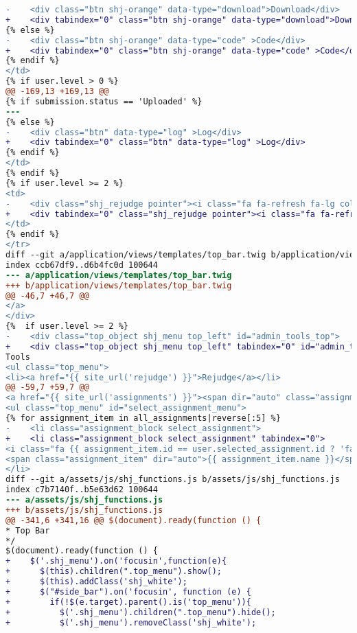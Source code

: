 \begin{itemize}
\begin{lstlisting}[language=diff, caption=Perubahan untuk mematuhi kriteria 2.1.1, label=lst_2.1.1, basicstyle=\ttfamily, frame=single,
columns=fullflexible, keepspaces=true, breaklines=true]
-    <div class="btn shj-orange" data-type="download">Download</div>
+    <div tabindex="0" class="btn shj-orange" data-type="download">Download</div>
{% else %}
-    <div class="btn shj-orange" data-type="code" >Code</div>
+    <div tabindex="0" class="btn shj-orange" data-type="code" >Code</div>
{% endif %}
</td>
{% if user.level > 0 %}
@@ -169,13 +169,13 @@
{% if submission.status == 'Uploaded' %}
---
{% else %}
-    <div class="btn" data-type="log" >Log</div>
+    <div tabindex="0" class="btn" data-type="log" >Log</div>
{% endif %}
</td>
{% endif %}
{% if user.level >= 2 %}
<td>
-    <div class="shj_rejudge pointer"><i class="fa fa-refresh fa-lg color10"></i></div>
+    <div tabindex="0" class="shj_rejudge pointer"><i class="fa fa-refresh fa-lg color10"></i></div>
</td>
{% endif %}
</tr>
diff --git a/application/views/templates/top_bar.twig b/application/views/templates/top_bar.twig
index ccb67df9..d6b4fc0d 100644
--- a/application/views/templates/top_bar.twig
+++ b/application/views/templates/top_bar.twig
@@ -46,7 +46,7 @@
</a>
</div>
{%  if user.level >= 2 %}
-    <div class="top_object shj_menu top_left" id="admin_tools_top">
+    <div class="top_object shj_menu top_left" tabindex="0" id="admin_tools_top">
Tools
<ul class="top_menu">
<li><a href="{{ site_url('rejudge') }}">Rejudge</a></li>
@@ -59,7 +59,7 @@
<a href="{{ site_url('assignments') }}"><span dir="auto" class="assignment_name">{{ user.selected_assignment.name|length > 30 ? user.selected_assignment.name|slice(0, 30) ~ '...' : user.selected_assignment.name }}</span></a>
<ul class="top_menu" id="select_assignment_menu">
{% for assignment_item in all_assignments|reverse[:5] %}
-    <li class="assignment_block select_assignment">
+    <li class="assignment_block select_assignment" tabindex="0">
<i class="fa {{ assignment_item.id == user.selected_assignment.id ? 'fa-check-square-o color6' : 'fa-square-o' }}" data-id="{{ assignment_item.id }}"></i>
<span class="assignment_item" dir="auto">{{ assignment_item.name }}</span>
</li>
diff --git a/assets/js/shj_functions.js b/assets/js/shj_functions.js
index c7b7140f..b5e63d62 100644
--- a/assets/js/shj_functions.js
+++ b/assets/js/shj_functions.js
@@ -341,6 +341,16 @@ $(document).ready(function () {
* Top Bar
*/
$(document).ready(function () {
+    $('.shj_menu').on('focusin',function(e){
+      $(this).children(".top_menu").show();
+      $(this).addClass('shj_white');
+      $("#side_bar").on('focusin', function (e) {
+        if(!$(e.target).parent().is('top_menu')){
+          $('.shj_menu').children(".top_menu").hide();
+          $('.shj_menu').removeClass('shj_white');

\end{lstlisting}
\end{itemize}
